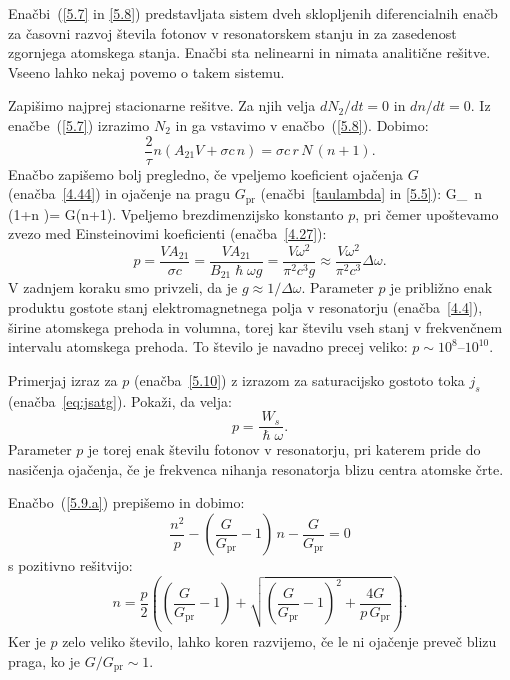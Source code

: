 Enačbi~(\ref{5.7} in \ref{5.8}) predstavljata sistem dveh sklopljenih diferencialnih enačb za 
časovni razvoj števila fotonov v resonatorskem stanju in za zasedenost 
zgornjega atomskega stanja. Enačbi sta nelinearni in nimata  
analitične rešitve. Vseeno lahko nekaj povemo o takem sistemu.

Zapišimo najprej stacionarne rešitve. Za njih velja $dN_2/dt=0$ in 
$dn/dt=0$. Iz enačbe~(\ref{5.7}) izrazimo $N_{2}$ in ga vstavimo v enačbo~(\ref{5.8}).
Dobimo:
\begin{equation}
\frac{2}{\tau }n\left(A_{21}V+\sigma c\,n\right)=
\sigma c\, r\,N\,(n+1).
\label{5.9}
\end{equation}
Enačbo zapišemo bolj pregledno, če vpeljemo koeficient ojačenja $G$ (enačba~\ref{4.44})
in ojačenje na pragu $G_\mathrm{pr}$ (enačbi~\ref{taulambda} in \ref{5.5}):
\beq
G_\, n\, \left(1+n \right)= G(n+1).
\label{5.9.a}
\eeq
Vpeljemo brezdimenzijsko konstanto $p$, pri čemer upoštevamo zvezo
med Einsteinovimi koeficienti (enačba~\ref{4.27}):
\begin{equation}
p=\frac{VA_{21}}{\sigma c} = 
\frac{VA_{21}}{B_{21}\hslash \omega g}=\frac{V\omega ^{2}}{\pi
^{2}c^{3}g}\approx
\frac{V\omega ^{2}}{\pi ^{2}c^{3}}\Delta \omega.  
\label{5.10}
\end{equation}
V zadnjem koraku smo privzeli, da je $g\approx 1/\Delta \omega $. 
Parameter $p$ je približno enak produktu 
gostote stanj elektromagnetnega polja v resonatorju (enačba~\ref{4.4}),
širine atomskega prehoda in volumna, torej kar številu vseh stanj 
v frekvenčnem intervalu atomskega prehoda. To število je navadno precej 
veliko: $p \sim 10^{8}$--$10^{10}$. 

\begin{naloga}
Primerjaj izraz za $p$ (enačba~\ref{5.10}) z izrazom za saturacijsko 
gostoto toka $j_s$ (enačba~\ref{eq:jsatg}). Pokaži, da velja:
\begin{equation}
p = \frac{W_s}{\hslash \omega}.
\end{equation}
Parameter $p$ je torej enak številu fotonov v resonatorju, pri katerem pride 
do nasičenja ojačenja, če je frekvenca nihanja resonatorja blizu 
centra atomske črte. 
\end{naloga}

Enačbo~(\ref{5.9.a}) prepišemo in dobimo:
\begin{equation}
\frac{n^2}{p}-\left(\frac{G}{G_\mathrm{pr}}-1\right)\,n-\frac{G}{G_\mathrm{pr}}=0
\label{5.11}
\end{equation}
s pozitivno rešitvijo: 
\begin{equation}
n=\frac{p}{2}\left( \left(\frac{G}{G_\mathrm{pr}}-1\right)+\sqrt{\left(\frac{G}{G_\mathrm{pr}}
-1\right)^{2}+ \frac{4G}{p\,G_\mathrm{pr}}}\right)\!\!.
\label{5.12}
\end{equation}
Ker je $p$ zelo veliko število, lahko koren razvijemo, če le ni ojačenje
preveč blizu praga, ko je $G/G_\mathrm{pr}\sim 1$. 

